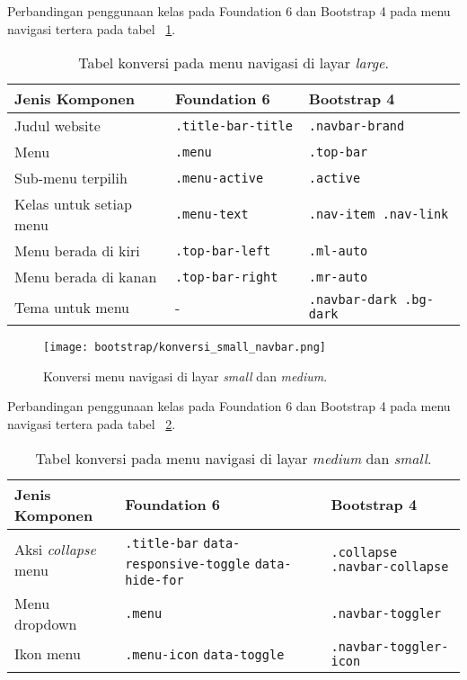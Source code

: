 \noindent Perbandingan penggunaan kelas pada Foundation 6 dan Bootstrap 4 pada menu navigasi tertera pada tabel ~\ref{table:konversiNavigasi}.\\
\begin{table}[H]
	\caption{Tabel konversi pada menu navigasi di layar \textit{large}.}
	\begin{tabular}{| p{} | p{} | p{} |} 
		\hline
		\textbf{Jenis Komponen} & \textbf{Foundation 6} & \textbf{Bootstrap 4}  \\ [0.5ex] 
		\hline	
		 Judul website & \texttt{.title-bar-title }& \texttt{.navbar-brand}  \\ 
		\hline
		Menu &\texttt{.menu }& \texttt{.top-bar } \\
		\hline
		Sub-menu terpilih & \texttt{.menu-active} & \texttt{.active}  \\
		\hline	
		Kelas untuk setiap menu & \texttt{.menu-text} & \texttt{.nav-item .nav-link} \\
		\hline	
		Menu berada di kiri & \texttt{.top-bar-left} & \texttt{.ml-auto}  \\
		\hline
		Menu berada di kanan & \texttt{.top-bar-right} & \texttt{.mr-auto}  \\
		\hline
		Tema untuk menu & - & \texttt{.navbar-dark .bg-dark}\\ [1ex] 
		\hline
	\end{tabular}
	\label{table:konversiNavigasi}
\end{table}

\begin{figure} [H]
	\centering  
	\texttt{[image: bootstrap/konversi\_small\_navbar.png]}  
	\caption{Konversi menu navigasi di layar \textit{small} dan \textit{medium}.} 
	\label{fig:konversiNavigasiSmall}
\end{figure}

\noindent Perbandingan penggunaan kelas pada Foundation 6 dan Bootstrap 4 pada menu navigasi tertera pada tabel ~\ref{table:konversiNavigasiSmall}.\\
\begin{table}[H]
	\caption{Tabel konversi pada menu navigasi di layar \textit{medium} dan \textit{small}.}
	\begin{tabular}{| p{} | p{} | p{} |} 
		\hline
		\textbf{Jenis Komponen} & \textbf{Foundation 6} & \textbf{Bootstrap 4}  \\ [0.5ex] 
		\hline	
		Aksi \textit{collapse} menu & \texttt{.title-bar} \texttt{data-responsive-toggle} \texttt{data-hide-for} & \texttt{.collapse} \texttt{.navbar-collapse}  \\ 
		\hline
		Menu dropdown & \texttt{.menu }& \texttt{.navbar-toggler } \\
		\hline
		Ikon menu & \texttt{.menu-icon} \texttt{data-toggle} & \texttt{.navbar-toggler-icon}  \\ [1ex] 
		\hline
	\end{tabular}
	\label{table:konversiNavigasiSmall}
\end{table}

